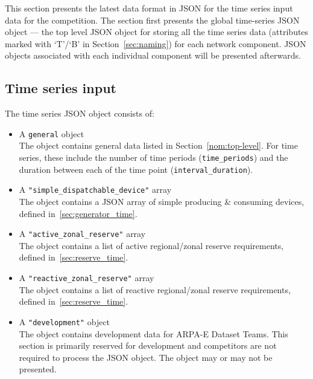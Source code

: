\label{sec:time_series}
This section presents the latest data format in JSON for the
time series input data for the competition.
The section first presents the global time-series JSON object --- the
top level JSON object for storing all the time series data
(attributes marked with `T'/`B' in Section~\ref{sec:naming})
for each network component.
JSON objects associated with each individual component will be presented afterwards.


\subsection{Time series input}
\label{sec:input_data}
The time series JSON object consists of:
\begin{itemize}
    \item A \texttt{general} object\\
    The object contains general data listed
    in Section~\ref{nom:top-level}.
    For time series, these include the number of time periods (\texttt{time\_periods}) and the duration
    between each of the time point (\texttt{interval\_duration}).
    \item A \texttt{"simple\_dispatchable\_device"} array\\
    The object contains a JSON array of simple producing \& consuming devices, defined in~\ref{sec:generator_time}.
    \item A \texttt{"active\_zonal\_reserve"} array\\
    The object contains a list of active regional/zonal reserve requirements, defined in~\ref{sec:reserve_time}.
    \item A \texttt{"reactive\_zonal\_reserve"} array\\
    The object contains a list of reactive regional/zonal reserve requirements, defined in~\ref{sec:reserve_time}.
    \item A \texttt{"development"} object\\
    The object contains development data for ARPA-E Dataset Teams. This section is primarily reserved for development and competitors are not required to process the JSON object. The object may or may not be presented.
\end{itemize}

